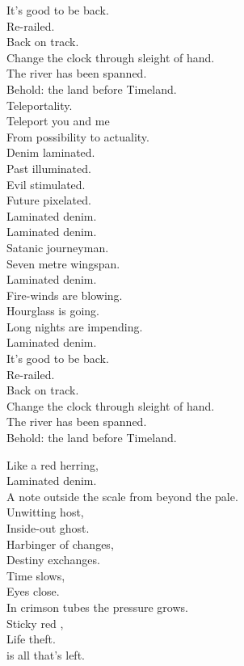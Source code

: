 It's good to be back. \\
Re-railed. \\
Back on track. \\
Change the clock through sleight of hand. \\
The river has been spanned. \\
Behold: the land before Timeland. \\

Teleportality. \\
Teleport you and me \\
From possibility to actuality. \\
Denim laminated. \\
Past illuminated. \\
Evil stimulated. \\
Future pixelated. \\

Laminated denim. \\

Laminated denim. \\
Satanic journeyman. \\
Seven metre wingspan. \\
Laminated denim. \\
Fire-winds are blowing. \\
Hourglass is going. \\
Long nights are impending. \\
Laminated denim. \\

It's good to be back. \\
Re-railed. \\
Back on track. \\
Change the clock through sleight of hand. \\
The river has been spanned. \\
Behold: the land before Timeland. \\





Like a red herring, \\
Laminated denim. \\
A note outside the scale from beyond the pale. \\
Unwitting host, \\
Inside-out ghost. \\
Harbinger of changes, \\
Destiny exchanges. \\
Time slows, \\
Eyes close. \\
In crimson tubes the pressure grows. \\
Sticky red , \\
Life theft. \\
 is all that's left. \\

